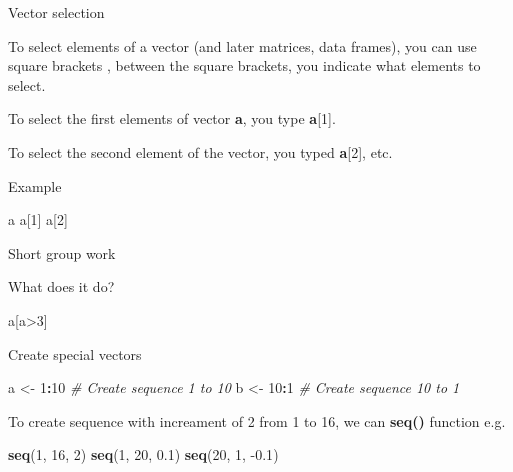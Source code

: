 \documentclass[
  ignorenonframetext,
]{beamer}
\newenvironment{Shaded}{\begin{snugshade}}{\end{snugshade}}
\newcommand{\CommentTok}[1]{\textcolor[rgb]{0.56,0.35,0.01}{\textit{#1}}}
\newcommand{\DecValTok}[1]{\textcolor[rgb]{0.00,0.00,0.81}{#1}}
\newcommand{\FloatTok}[1]{\textcolor[rgb]{0.00,0.00,0.81}{#1}}
\newcommand{\KeywordTok}[1]{\textcolor[rgb]{0.13,0.29,0.53}{\textbf{#1}}}
\newcommand{\NormalTok}[1]{#1}
\newcommand{\OperatorTok}[1]{\textcolor[rgb]{0.81,0.36,0.00}{\textbf{#1}}}
\newcommand{\StringTok}[1]{\textcolor[rgb]{0.31,0.60,0.02}{#1}}
\begin{document}
\begin{frame}[fragile]{Vector selection}
\protect\hypertarget{vector-selection}{}

To select elements of a vector (and later matrices, data frames), you
can use square brackets \protect\hyperlink{section}{}, between the
square brackets, you indicate what elements to select.

To select the first elements of vector \textbf{a}, you type
\textbf{a}{[}1{]}.

To select the second element of the vector, you typed \textbf{a}{[}2{]},
etc.

\begin{block}{Example}

\begin{Shaded}
\begin{Highlighting}[]
\NormalTok{a}
\NormalTok{a[}\DecValTok{1}\NormalTok{]}
\NormalTok{a[}\DecValTok{2}\NormalTok{]}
\end{Highlighting}
\end{Shaded}

\end{block}

\end{frame}

\begin{frame}[fragile]{Short group work}
\protect\hypertarget{short-group-work}{}

\begin{block}{What does it do?}

a{[}a\textgreater3{]}

\end{block}

\begin{block}{Create special vectors}

\begin{Shaded}
\begin{Highlighting}[]
\NormalTok{a <-}\StringTok{ }\DecValTok{1}\OperatorTok{:}\DecValTok{10} \CommentTok{# Create sequence 1 to 10}
\NormalTok{b <-}\StringTok{ }\DecValTok{10}\OperatorTok{:}\DecValTok{1} \CommentTok{# Create sequence 10 to 1}
\end{Highlighting}
\end{Shaded}

To create sequence with increament of 2 from 1 to 16, we can
\textbf{seq()} function e.g.

\begin{Shaded}
\begin{Highlighting}[]
\KeywordTok{seq}\NormalTok{(}\DecValTok{1}\NormalTok{, }\DecValTok{16}\NormalTok{, }\DecValTok{2}\NormalTok{)}
\KeywordTok{seq}\NormalTok{(}\DecValTok{1}\NormalTok{, }\DecValTok{20}\NormalTok{, }\FloatTok{0.1}\NormalTok{)}
\KeywordTok{seq}\NormalTok{(}\DecValTok{20}\NormalTok{, }\DecValTok{1}\NormalTok{, }\FloatTok{-0.1}\NormalTok{)}
\end{Highlighting}
\end{Shaded}

\end{block}

\end{frame}
\end{document}
